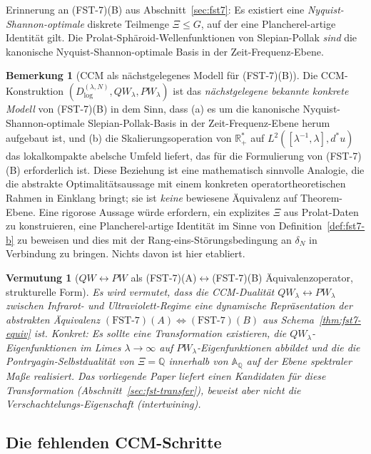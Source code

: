 \documentclass[11pt,a4paper]{article}
\theoremstyle{plain}
\newtheorem{conjecture}[theorem]{Vermutung}
\theoremstyle{definition}
\newtheorem{remark}[theorem]{Bemerkung}
\newcommand{\R}{\mathbb{R}}
\newcommand{\Q}{\mathbb{Q}}
\newcommand{\A}{\mathbb{A}}
\begin{document}
Erinnerung an (FST-7)(B) aus Abschnitt~\ref{sec:fst7}: Es existiert eine
\emph{Nyquist-Shannon-optimale} diskrete Teilmenge $\Xi \le G$, auf der
eine Plancherel-artige Identität gilt. Die Prolat-Sphäroid-Wellenfunktionen
von Slepian-Pollak \emph{sind} die kanonische Nyquist-Shannon-optimale
Basis in der Zeit-Frequenz-Ebene.

\begin{remark}[CCM als nächstgelegenes Modell für (FST-7)(B)]\label{rem:ccm-closest-model}
Die CCM-Konstruktion $(D^{(\lambda,N)}_{\log}, QW_\lambda, PW_\lambda)$
ist das \emph{nächstgelegene bekannte konkrete Modell} von (FST-7)(B) in dem Sinn,
dass (a) es um die kanonische Nyquist-Shannon-optimale Slepian-Pollak-Basis
in der Zeit-Frequenz-Ebene herum aufgebaut ist, und (b) die Skalierungsoperation
von $\R_+^\ast$ auf $L^2([\lambda^{-1},\lambda], d^\ast u)$ das lokalkompakte abelsche
Umfeld liefert, das für die Formulierung von (FST-7)(B) erforderlich ist. Diese
Beziehung ist eine mathematisch sinnvolle Analogie, die die abstrakte
Optimalitätsaussage mit einem konkreten operatortheoretischen Rahmen in Einklang
bringt; sie ist \emph{keine} bewiesene Äquivalenz auf Theorem-Ebene. Eine
rigorose Aussage würde erfordern, ein explizites $\Xi$ aus Prolat-Daten zu
konstruieren, eine Plancherel-artige Identität im Sinne von Definition~\ref{def:fst7-b}
zu beweisen und dies mit der Rang-eins-Störungsbedingung an $\delta_N$ in
Verbindung zu bringen. Nichts davon ist hier etabliert.
\end{remark}

\begin{conjecture}[$QW\!\leftrightarrow\! PW$ als (FST-7)(A)$\leftrightarrow$(FST-7)(B) Äquivalenzoperator, strukturelle Form]\label{conj:qw-pw-fst7}
Es wird vermutet, dass die CCM-Dualität $QW_\lambda \leftrightarrow PW_\lambda$
zwischen Infrarot- und Ultraviolett-Regime eine dynamische Repräsentation
der abstrakten Äquivalenz $(\text{FST-7})(A) \Leftrightarrow (\text{FST-7})(B)$
aus Schema~\ref{thm:fst7-equiv} ist. Konkret: Es sollte eine Transformation
existieren, die $QW_\lambda$-Eigenfunktionen im Limes $\lambda \to \infty$ auf
$PW_\lambda$-Eigenfunktionen abbildet und die die Pontryagin-Selbstdualität
von $\Xi = \Q$ innerhalb von $\A_\Q$ auf der Ebene spektraler Maße realisiert.
Das vorliegende Paper liefert einen Kandidaten für diese Transformation
(Abschnitt~\ref{sec:fst-transfer}), beweist aber nicht die Verschachtelungs-Eigenschaft (intertwining).
\end{conjecture}

\subsection{Die fehlenden CCM-Schritte}
\label{sec:ccm-missing-steps}
\end{document}
